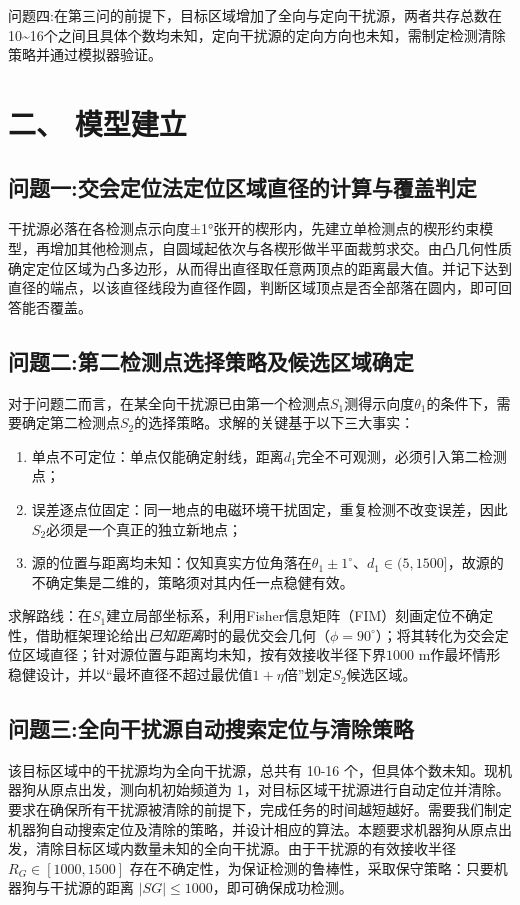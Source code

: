 \documentclass[UTF8, zihao=5,AutoFakeBold=2]{ctexart}
\begin{document}
		问题四:\quad 在第三问的前提下，目标区域增加了全向与定向干扰源，两者共存总数在10\textasciitilde16个之间且具体个数均未知，定向干扰源的定向方向也未知，需制定检测清除策略并通过模拟器验证。

\section*{二、 模型建立}
	\subsection*{问题一:交会定位法定位区域直径的计算与覆盖判定}
	干扰源必落在各检测点示向度±1°张开的楔形内，先建立单检测点的楔形约束模型，再增加其他检测点，自圆域起依次与各楔形做半平面裁剪求交。由凸几何性质确定定位区域为凸多边形，从而得出直径取任意两顶点的距离最大值。并记下达到直径的端点，以该直径线段为直径作圆，判断区域顶点是否全部落在圆内，即可回答能否覆盖。
    
	\subsection*{问题二:第二检测点选择策略及候选区域确定}
	对于问题二而言，在某全向干扰源已由第一个检测点\(S_1\)测得示向度\(\theta_1\)的条件下，需要确定第二检测点\(S_2\)的选择策略。求解的关键基于以下三大事实：
    \begin{enumerate}[label=(\arabic*)]
        \item 单点不可定位：单点仅能确定射线，距离\(d_1\)完全不可观测，必须引入第二检测点；
        \item 误差逐点位固定：同一地点的电磁环境干扰固定，重复检测不改变误差，因此\(S_2\)必须是一个真正的独立新地点；
        \item 源的位置与距离均未知：仅知真实方位角落在\(\theta_1\pm1^\circ\)、\(d_1\in(5,1500]\)，故源的不确定集是二维的，策略须对其内任一点稳健有效。
    \end{enumerate}
    求解路线：在\(S_1\)建立局部坐标系，利用Fisher信息矩阵（FIM）刻画定位不确定性，借助框架理论给出\emph{已知距离}时的最优交会几何（\(\phi=90^\circ\)）；将其转化为交会定位区域直径；针对源位置与距离均未知，按有效接收半径下界\(1000\) m作最坏情形稳健设计，并以“最坏直径不超过最优值\(1+\eta\)倍”划定\(S_2\)候选区域。
    
	\subsection*{问题三:全向干扰源自动搜索定位与清除策略}
	该目标区域中的干扰源均为全向干扰源，总共有 10-16 个，但具体个数未知。现机器狗从原点出发，测向机初始频道为 1，对目标区域干扰源进行自动定位并清除。要求在确保所有干扰源被清除的前提下，完成任务的时间越短越好。需要我们制定机器狗自动搜索定位及清除的策略，并设计相应的算法。本题要求机器狗从原点出发，清除目标区域内数量未知的全向干扰源。由于干扰源的有效接收半径 \(R_G \in [1000,1500]\) 存在不确定性，为保证检测的鲁棒性，采取保守策略：只要机器狗与干扰源的距离 \(|SG| \le 1000\)，即可确保成功检测。
\end{document}
